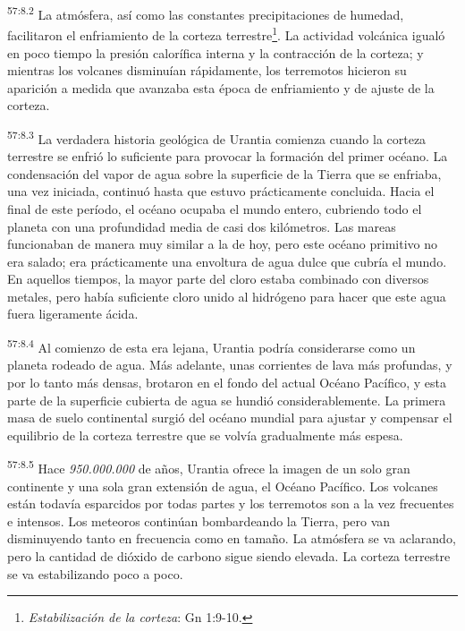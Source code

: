 \par
\textsuperscript{57:8.2} La atmósfera, así como las constantes precipitaciones de humedad, facilitaron el enfriamiento de la corteza terrestre\footnote{\textit{Estabilización de la corteza}: Gn 1:9-10.}. La actividad volcánica igualó en poco tiempo la presión calorífica interna y la contracción de la corteza; y mientras los volcanes disminuían rápidamente, los terremotos hicieron su aparición a medida que avanzaba esta época de enfriamiento y de ajuste de la corteza.

\par
\textsuperscript{57:8.3} La verdadera historia geológica de Urantia comienza cuando la corteza terrestre se enfrió lo suficiente para provocar la formación del primer océano. La condensación del vapor de agua sobre la superficie de la Tierra que se enfriaba, una vez iniciada, continuó hasta que estuvo prácticamente concluida. Hacia el final de este período, el océano ocupaba el mundo entero, cubriendo todo el planeta con una profundidad media de casi dos kilómetros. Las mareas funcionaban de manera muy similar a la de hoy, pero este océano primitivo no era salado; era prácticamente una envoltura de agua dulce que cubría el mundo. En aquellos tiempos, la mayor parte del cloro estaba combinado con diversos metales, pero había suficiente cloro unido al hidrógeno para hacer que este agua fuera ligeramente ácida.

\par
\textsuperscript{57:8.4} Al comienzo de esta era lejana, Urantia podría considerarse como un planeta rodeado de agua. Más adelante, unas corrientes de lava más profundas, y por lo tanto más densas, brotaron en el fondo del actual Océano Pacífico, y esta parte de la superficie cubierta de agua se hundió considerablemente. La primera masa de suelo continental surgió del océano mundial para ajustar y compensar el equilibrio de la corteza terrestre que se volvía gradualmente más espesa.

\par
\textsuperscript{57:8.5} Hace \textit{950.000.000} de años, Urantia ofrece la imagen de un solo gran continente y una sola gran extensión de agua, el Océano Pacífico. Los volcanes están todavía esparcidos por todas partes y los terremotos son a la vez frecuentes e intensos. Los meteoros continúan bombardeando la Tierra, pero van disminuyendo tanto en frecuencia como en tamaño. La atmósfera se va aclarando, pero la cantidad de dióxido de carbono sigue siendo elevada. La corteza terrestre se va estabilizando poco a poco.

